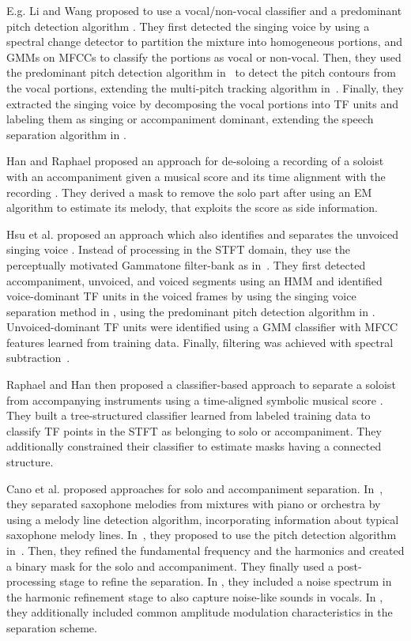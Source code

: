 E.g. Li and Wang proposed to use a vocal/non-vocal classifier and a predominant pitch detection algorithm \cite{li06, li07}. They first detected the singing voice by using a spectral change detector \cite{duxbury03} to partition the mixture into homogeneous portions, and GMMs on MFCCs to classify the portions as vocal or non-vocal. Then, they used the predominant pitch detection algorithm in~\cite{li05} to detect the pitch contours from the vocal portions, extending the multi-pitch tracking algorithm in~\cite{wu03}. Finally, they extracted the singing voice by decomposing the vocal portions into TF units and labeling them as singing or accompaniment dominant, extending the speech separation algorithm in \cite{hu02}.
\par
Han and Raphael proposed an approach for de-soloing a recording of a soloist with an accompaniment given a musical score and its time alignment with the recording \cite{han07}. They derived a mask \cite{roweis01} to remove the solo part after using an EM algorithm to estimate its melody, that exploits the score as side information.
\par
Hsu et al. proposed an approach which also identifies and separates the unvoiced singing voice \cite{hsu08,hsu10}. Instead of processing in the STFT domain, they use the perceptually motivated Gammatone filter-bank as in~\cite{hu02,li07}. They first detected accompaniment, unvoiced, and voiced segments using an HMM and identified voice-dominant TF units in the voiced frames by using the singing voice separation method in \cite{li07}, using the predominant pitch detection algorithm in \cite{dressler062}. Unvoiced-dominant TF units were identified using a GMM classifier with MFCC features learned from training data. Finally, filtering was achieved with spectral subtraction~\cite{scalart96}.
\par
Raphael and Han then proposed a classifier-based approach to separate a soloist from accompanying instruments using a time-aligned symbolic musical score \cite{raphael08}. They built a tree-structured classifier \cite{breiman84} learned from labeled training data to classify TF points in the STFT as belonging to solo or accompaniment. They additionally constrained their classifier to estimate masks having a connected structure.
\par
Cano et al. proposed approaches for solo and accompaniment separation. In~\cite{cano09}, they separated saxophone melodies from mixtures with piano or orchestra by using a melody line detection algorithm, incorporating information about typical saxophone melody lines. In~\cite{grollmisch11,dittmar12,cano12}, they proposed to use the pitch detection algorithm in~\cite{dressler11}. Then, they refined the fundamental frequency and the harmonics and created a binary mask for the solo and accompaniment. They finally used a post-processing stage to refine the separation. In \cite{cano13}, they included a noise spectrum in the harmonic refinement stage to also capture noise-like sounds in vocals. In \cite{cano14}, they additionally included common amplitude modulation characteristics in the separation scheme.
